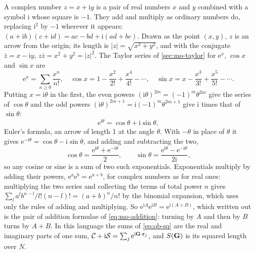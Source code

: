 \begin{toolbox}
A complex number $z = x + \mathrm{i}y$ is a pair of real numbers $x$ and
$y$ combined with a symbol $\mathrm{i}$ whose square is $-1$. They add and
multiply as ordinary numbers do, replacing $\mathrm{i}^2$ by $-1$
wherever it appears: $(a + \mathrm{i}b)(c + \mathrm{i}d) = ac - bd +
\mathrm{i}(ad + bc)$. Drawn as the point $(x, y)$, $z$ is an arrow from
the origin; its length is $\lvert z\rvert = \sqrt{x^2 + y^2}$, and with
the conjugate $\bar z = x - \mathrm{i}y$, $z\bar z = x^2 + y^2 = \lvert z
\rvert^2$. The Taylor series of \cref{sec:mo-taylor} for $\mathrm{e}^x$,
$\cos x$ and $\sin x$ are
\begin{equation*}
   \mathrm{e}^x = \sum_{n\ge0}\frac{x^n}{n!} , \quad
   \cos x = 1 - \frac{x^2}{2!} + \frac{x^4}{4!} - \cdots , \quad
   \sin x = x - \frac{x^3}{3!} + \frac{x^5}{5!} - \cdots .
\end{equation*}
Putting $x = \mathrm{i}\theta$ in the first, the even powers
$(\mathrm{i}\theta)^{2m} = (-1)^m\theta^{2m}$ give the series of $\cos\theta$
and the odd powers $(\mathrm{i}\theta)^{2m+1} = \mathrm{i}(-1)^m
\theta^{2m+1}$ give $\mathrm{i}$ times that of $\sin\theta$:
\begin{equation*}
   \mathrm{e}^{\mathrm{i}\theta} = \cos\theta + \mathrm{i}\sin\theta ,
\end{equation*}
Euler's formula, an arrow of length 1 at the angle $\theta$. With
$-\theta$ in place of $\theta$ it gives $\mathrm{e}^{-\mathrm{i}\theta} =
\cos\theta - \mathrm{i}\sin\theta$, and adding and subtracting the two,
\begin{equation*}
   \cos\theta = \frac{\mathrm{e}^{\mathrm{i}\theta} +
   \mathrm{e}^{-\mathrm{i}\theta}}{2} , \qquad
   \sin\theta = \frac{\mathrm{e}^{\mathrm{i}\theta} -
   \mathrm{e}^{-\mathrm{i}\theta}}{2\mathrm{i}} ,
\end{equation*}
so any cosine or sine is a sum of two such exponentials. Exponentials
multiply by adding their powers, $\mathrm{e}^a\mathrm{e}^b = \mathrm{e}^{a
+ b}$, for complex numbers as for real ones: multiplying the two series
and collecting the terms of total power $n$ gives $\sum_{l}a^lb^{n -
l}/l!(n - l)! = (a + b)^n/n!$ by the binomial expansion, which uses only
the rules of adding and multiplying. So $\mathrm{e}^{\mathrm{i}A}
\mathrm{e}^{\mathrm{i}B} = \mathrm{e}^{\mathrm{i}(A + B)}$, which written
out is the pair of addition formulae of \cref{eq:mo-addition}: turning by
$A$ and then by $B$ turns by $A + B$. In this language the sums of
\cref{eq:ob-sq} are the real and imaginary parts of one sum, $\mathcal{C}
+ \mathrm{i}\mathcal{S} = \sum_j\mathrm{e}^{\mathrm{i}\bm{\mathrm{G}}\cdot\bm{\mathrm{r}}_j}$,
and $S(\bm{\mathrm{G}})$ is its squared length over $N$.
\end{toolbox}

